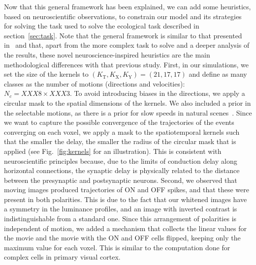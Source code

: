 \documentclass[default]{sn-jnl}%
\theoremstyle{thmstyleone}%
\theoremstyle{thmstyletwo}%
\theoremstyle{thmstylethree}%
\newcommand{\seeFig}[1]{see Fig.~\ref{fig:#1}}%
\newcommand{\Kx}{K_\text{X}}
\newcommand{\Ky}{K_\text{Y}}
\newcommand{\Ktime}{K_\text{T}}
\newcommand{\class}{c} %
\begin{document}
Now that this general framework has been explained, we can add some heuristics, based on neuroscientific observations, to constrain our model and its strategies for solving the task used to solve the ecological task described in section~\ref{sec:task}. Note that the general framework is similar to that presented in~\cite{grimaldi_learning_2022} and that, apart from the more complex task to solve and a deeper analysis of the results, these novel neuroscience-inspired heuristics are the main methodological differences with that previous study. First, in our simulations, we set the size of the kernels to $(\Ktime, \Kx, \Ky) = (21, 17, 17)$ and define as many classes as the number of motions (directions and velocities): $N_\class = XXX8 \times XXX3$. To avoid introducing biases in the directions, we apply a circular mask to the spatial dimensions of the kernels. We also included a prior in the selectable motions, as there is a prior for slow speeds in natural scenes~\citep{vacher_bayesian_2018}. Since we want to capture the possible convergence of the trajectories of the events converging on each voxel, we apply a mask to the spatiotemporal kernels such that the smaller the delay, the smaller the radius of the circular mask that is applied (\seeFig{kernels} for an illustration). This is consistent with neuroscientific principles because, due to the limits of conduction delay along horizontal connections, the synaptic delay is physically related to the distance between the presynaptic and postsynaptic neurons. Second, we observed that moving images produced trajectories of ON and OFF spikes, and that these were present in both polarities. This is due to the fact that our whitened images have a symmetry in the luminance profiles, and an image with inverted contrast is indistinguishable from a standard one. Since this arrangement of polarities is independent of motion, we added a mechanism that collects the linear values for the movie and the movie with the ON and OFF cells flipped, keeping only the maximum value for each voxel. This is similar to the computation done for complex cells in primary visual cortex.
\end{document}
